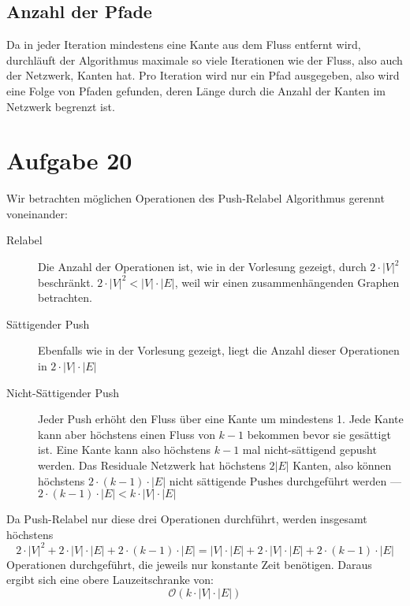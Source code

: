 \documentclass[parskip=half,a4paper]{scrartcl}
\begin{document}
\subsection*{Anzahl der Pfade}

Da in jeder Iteration mindestens eine Kante aus dem Fluss entfernt wird, durchläuft der Algorithmus maximale so viele Iterationen wie der Fluss, also auch der Netzwerk, Kanten hat. Pro Iteration wird nur ein Pfad ausgegeben, also wird eine Folge von Pfaden gefunden, deren Länge durch die Anzahl der Kanten im Netzwerk begrenzt ist.

\section*{Aufgabe 20}

Wir betrachten möglichen Operationen des Push-Relabel Algorithmus gerennt voneinander:

\begin{description}
\item [Relabel] Die Anzahl der Operationen ist, wie in der Vorlesung gezeigt, durch $2 \cdot |V|^2$ beschränkt. $2 \cdot |V|^2 < |V| \cdot |E|$, weil wir einen zusammenhängenden Graphen betrachten.
\item [Sättigender Push] Ebenfalls wie in der Vorlesung gezeigt, liegt die Anzahl dieser Operationen in $2 \cdot |V| \cdot |E|$
\item [Nicht-Sättigender Push] Jeder Push erhöht den Fluss über eine Kante um mindestens 1. Jede Kante kann aber höchstens einen Fluss von $k-1$ bekommen bevor sie gesättigt ist. Eine Kante kann also höchstens $k-1$ mal nicht-sättigend gepusht werden. Das Residuale Netzwerk hat höchstens $2|E|$ Kanten, also können höchstens $2 \cdot (k-1) \cdot |E|$ nicht sättigende Pushes durchgeführt werden --- $2 \cdot (k-1) \cdot |E| < k \cdot |V| \cdot |E|$
\end{description}

Da Push-Relabel nur diese drei Operationen durchführt, werden insgesamt höchstens $$2 \cdot |V|^2 + 2 \cdot |V| \cdot |E| + 2 \cdot (k-1) \cdot |E| = |V| \cdot |E| + 2 \cdot |V| \cdot |E| + 2 \cdot (k-1) \cdot |E|$$ Operationen durchgeführt, die jeweils nur konstante Zeit benötigen. Daraus ergibt sich eine obere Lauzeitschranke von: $$\mathcal{O}(k \cdot |V| \cdot |E|)$$
\end{document}
